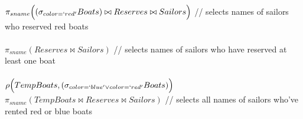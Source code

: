 \documentclass{article}
\begin{document}
$\pi_{sname}\Big((\sigma_{color=`red'}Boats)\bowtie Reserves \bowtie Sailors\Big)$ // selects names of sailors who reserved red boats
\\\\
$\pi_{sname}(Reserves \bowtie Sailors)$ // selects names of sailors who have reserved at least one boat
\\\\
$\rho\Big(TempBoats, (\sigma_{color=`blue'\vee color=`red'}Boats)\Big)$\\
$\pi_{sname}(TempBoats \bowtie Reserves \bowtie Sailors)$ // selects all names of sailors who've rented red or blue boats
\end{document}
